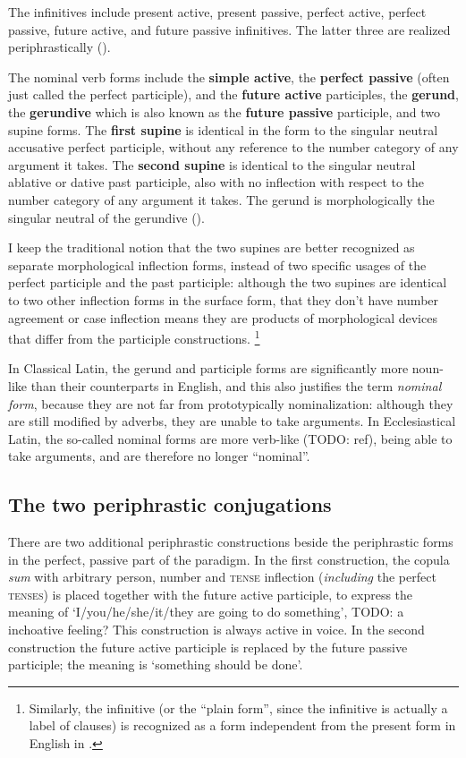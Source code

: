 \documentclass[a4paper, oneside, 12pt]{report}
\newcommand*{\citepage}[1]{p.~{#1}}
\newcommand*{\concept}[1]{\textbf{#1}}
\newcommand*{\term}[1]{\emph{#1}}
\newcommand{\form}[1]{\emph{#1}}
\newcommand*{\category}[1]{\textsc{#1}}
\newcommand{\translate}[1]{`#1'}
\begin{document}
The infinitives include present active, present passive, perfect active, 
perfect passive, future active, and future passive infinitives.
The latter three are realized periphrastically ().

The nominal verb forms include 
the \concept{simple active}, 
the \concept{perfect passive} (often just called the perfect participle), 
and the \concept{future active} participles,
the \concept{gerund}, 
the \concept{gerundive} which is also known as the \concept{future passive} participle, 
and two supine forms.
The \concept{first supine} is identical in the form to the singular neutral accusative perfect participle,
without any reference to the number category of any argument it takes.
The \concept{second supine} is identical to the singular neutral ablative or dative past participle,
also with no inflection with respect to the number category of any argument it takes.
The gerund is morphologically the singular neutral of the gerundive
().

I keep the traditional notion that 
the two supines are better recognized as separate morphological inflection forms,
instead of two specific usages of the perfect participle and the past participle:
although the two supines are identical to two other inflection forms in the surface form,
that they don't have number agreement or case inflection 
means they are products of morphological devices that differ from the participle constructions.%
\footnote{
    Similarly, the infinitive 
    (or the ``plain form'', since the infinitive is actually a label of clauses)
    is recognized as a form 
    independent from the present form in English in \citet[\citepage{74}]{cgel}.
}

In Classical Latin, the gerund and participle forms are significantly more noun-like 
than their counterparts in English,
and this also justifies the term \term{nominal form},
because they are not far from prototypically nominalization:
although they are still modified by adverbs,
they are unable to take arguments.
In Ecclesiastical Latin, 
the so-called nominal forms are more verb-like (TODO: ref),
being able to take arguments,
and are therefore no longer ``nominal''.

\subsection{The two periphrastic conjugations}

There are two additional periphrastic constructions 
beside the periphrastic forms in the perfect, passive part of the paradigm.
In the first construction, 
the copula \form{sum} with arbitrary person, number and \category{tense} inflection 
(\emph{including} the perfect \category{tenses})
is placed together with the future active participle,
to express the meaning of \translate{I/you/he/she/it/they are going to do something}, 
TODO: a inchoative feeling?
This construction is always active in voice.
In the second construction the future active participle is replaced by the future passive participle;
the meaning is \translate{something should be done}.
\end{document}
